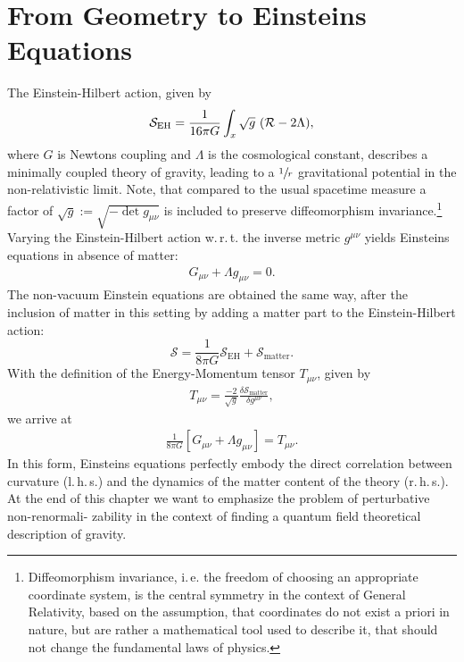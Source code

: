 \section{From Geometry to Einsteins Equations}
The Einstein-Hilbert action, given by
\begin{align}
	\mathcal{S}_{\text{EH}} = \frac{1}{16\pi G} \int_x \sqrt{g} \ (\Ricci - 2\Lambda), 
\end{align}
where $G$ is Newtons coupling and $\Lambda$ is the cosmological constant, describes a minimally coupled theory of gravity, leading to a $\sfrac{1}{r}$ gravitational potential in the non-relativistic limit. Note, that compared to the usual spacetime measure a factor of $\sqrt{g} := \sqrt{-\operatorname{det}g_{\mu\nu}}$ is included to preserve diffeomorphism invariance.\footnote{Diffeomorphism invariance, i.\,e. the freedom of choosing an appropriate coordinate system, is the central symmetry in the context of General Relativity, based  on the assumption, that coordinates do not exist a priori in nature, but are rather a mathematical tool used to describe it, that should not change the fundamental laws of physics.\nopagebreak} \\ 
Varying the Einstein-Hilbert action w.\,r.\,t. the inverse metric $g^{\mu\nu}$ yields Einsteins equations in absence of matter:
\begin{align}
	G_{\mu\nu} + \Lambda g_{\mu\nu} = 0.
\end{align}
The non-vacuum Einstein equations are obtained the same way, after the inclusion of matter in this setting  by adding a matter part to the Einstein-Hilbert action:
\begin{equation}
	\mathcal{S} = \frac{1}{8\pi G}\mathcal{S}_{\mathrm{EH}} + \mathcal{S}_{\text{matter}}.
\end{equation}
With the definition of the Energy-Momentum tensor $T_{\mu\nu}$, given by
\begin{align}
	T_{\mu\nu} = \frac{-2}{\sqrt{g}} \frac{\delta\mathcal{S}_{\text{matter}}}{\delta g^{\mu\nu}},
\end{align}
we arrive at 
\begin{align}
\frac{1}{8\pi G}\left[G_{\mu\nu} + \Lambda g_{\mu\nu}\right] = T_{\mu\nu}.	
\end{align}
In this form, Einsteins equations perfectly embody the direct correlation between curvature (l.\,h.\,s.) and the dynamics of the matter content of the theory (r.\,h.\,s.). \\
At the end of this chapter we want to emphasize the problem of perturbative non-renormali- zability in the context of finding a quantum field theoretical description of gravity. 
